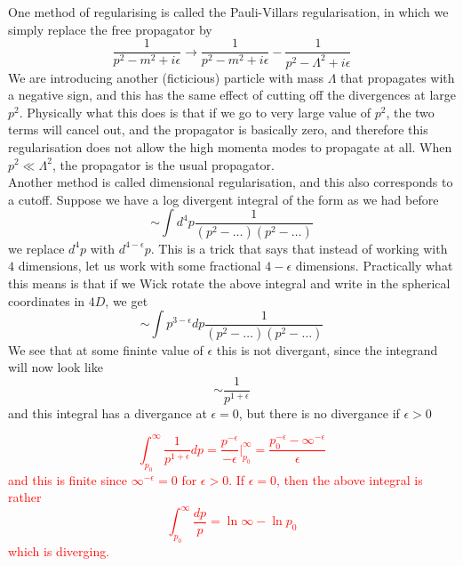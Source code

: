 \documentclass[11pt]{article}
\numberwithin{equation}{section}
\begin{document}
One method of regularising is called the Pauli-Villars regularisation, in which we simply replace the free propagator by 
\begin{equation*}
    \frac{1}{p^2 - m^2 + i\epsilon} \longrightarrow \frac{1}{p^2 - m^2 + i\epsilon} - \frac{1}{p^2 - \Lambda^2 + i\epsilon}
\end{equation*}
We are introducing another (ficticious) particle with mass \(\Lambda\) that propagates with a negative sign, and this has the same effect of cutting off the divergences at large \(p^2\). Physically what this does is that if we go to very large value of \(p^2\), the two terms will cancel out, and the propagator is basically zero, and therefore this regularisation does not allow the high momenta modes to propagate at all. When \(p^2 \ll \Lambda^2\), the propagator is the usual propagator.\\

Another method is called dimensional regularisation, and this also corresponds to a cutoff. Suppose we have a log divergent integral of the form as we had before 
\begin{equation*}
    \sim \int d^4p\frac{1}{(p^2 - \ldots)(p^2 - \ldots)}
\end{equation*}
we replace \(d^4p\) with \(d^{4-\epsilon}p\). This is a trick that says that instead of working with \(4\) dimensions, let us work with some fractional \(4-\epsilon\) dimensions. Practically what this means is that if we Wick rotate the above integral and write in the spherical coordinates in \(4D\), we get 
\begin{equation*}
    \sim \int p^{3-\epsilon}dp\frac{1}{(p^2 - \ldots)(p^2 - \ldots)}
\end{equation*}
We see that at some fininte value of \(\epsilon\) this is not divergant, since the integrand will now look like 
\begin{equation*}
    \sim \frac{1}{p^{1+\epsilon}}
\end{equation*}
and this integral has a divergance at \(\epsilon = 0\), but there is no divergance if \(\epsilon>0\)

\textcolor{red}{
    \begin{equation*}
        \int_{p_0}^\infty \frac{1}{p^{1+\epsilon}} dp = \frac{p^{-\epsilon}}{-\epsilon} \bigg|_{p_0}^\infty = \frac{p_0^{-\epsilon} - \infty^{-\epsilon}}{\epsilon}
    \end{equation*}
    and this is finite since \(\infty^{-\epsilon} = 0\) for \(\epsilon>0\). If \(\epsilon = 0\), then the above integral is rather 
    \begin{equation*}
        \int_{p_0}^\infty \frac{dp}{p} = \ln{\infty} - \ln p_0
    \end{equation*}
    which is diverging.\\
}
\end{document}
